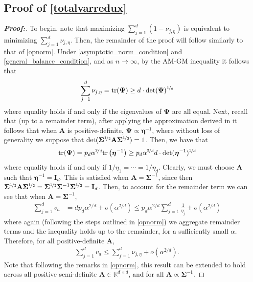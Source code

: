 \documentclass[11pt,twoside]{article}
\theoremstyle{definition}
\theoremstyle{remark}
\begin{document}
\subsection{Proof of \texorpdfstring{\cref{totalvarredux}}{Theorem 3}} \label{totalvarredux_proof}
\begin{proof}[\textbf{Proof:}]
To begin, note that maximizing $\sum^d_{j=1}(1 - \nu_{j, \eta})$ is equivalent to minimizing $\sum^d_{j=1} \nu_{j, \eta}$. Then, the remainder of the proof will follow similarly to that of \cref{opnorm}. Under \cref{asymptotic_norm_condition} and \cref{general_balance_condition}, and as $n \to \infty$, by the AM-GM inequality it follows that
\begin{align*}
    \sum^d_{j=1} \nu_{j, \eta} = \text{tr}(\mathbf{\Psi})  \geq d  \cdot \text{det}(\mathbf{\Psi})^{\nicefrac{1}{d}}
\end{align*}
where equality holds if and only if the eigenvalues of $\mathbf{\Psi}$ are all equal. Next, recall that (up to a remainder term), after applying the approximation derived in \cite{lu2023design} it follows that when $\mathbf{A}$ is positive-definite, $\mathbf{\Psi} \propto \bm{\eta}^{-1}$, where without loss of generality we suppose that $\text{det}(\mathbf{\Sigma}^{\nicefrac{1}{2}}\mathbf{A}\mathbf{\Sigma}^{\nicefrac{1}{2}}) = 1$. Then, we have that
\begin{align*}
     \text{tr}(\mathbf{\Psi}) =  p_d \alpha^{\nicefrac{2}{d}} \text{tr}\left( \bm{\eta}^{-1}   \right) \geq p_d \alpha^{\nicefrac{2}{d}} d \cdot \text{det}(\bm{\eta}^{-1})^{\nicefrac{1}{d}}
\end{align*}
where equality holds if and only if $1/\eta_1 = \cdots = 1 / \eta_d$. Clearly, we must choose $\mathbf{A}$ such that $\bm{\eta}^{-1} = \mathbf{I}_d$. This is satisfied when $\mathbf{A} = \mathbf{\Sigma}^{-1}$, since then $\mathbf{\Sigma}^{\nicefrac{1}{2}}\mathbf{A}\mathbf{\Sigma}^{\nicefrac{1}{2}} = \mathbf{\Sigma}^{\nicefrac{1}{2}} \mathbf{\Sigma}^{-1}\mathbf{\Sigma}^{\nicefrac{1}{2}} = \mathbf{I}_d$. Then, to account for the remainder term we can see that when $\mathbf{A} = \mathbf{\Sigma}^{-1}$,
    \begin{align*}
        \sum^d_{j=1} v_a &= d p_d \alpha^{2/d} + o(\alpha^{2/d}) \leq  p_d \alpha^{2/d} \sum^d_{j=1} \frac{1}{\eta_j} + o(\alpha^{2/d})
    \end{align*}
where again (following the steps outlined in \cref{opnorm}) we aggregate remainder terms and the inequality holds up to the remainder, for a sufficiently small $\alpha$. Therefore, for all positive-definite $\mathbf{A}$,
    \begin{align*}
         \sum^d_{j=1} v_a  \leq \sum^d_{j=1} \nu_{j, \eta} + o(\alpha^{2/d}).
    \end{align*}
Note that following the remarks in \cref{opnorm}, this result can be extended to hold across all positive semi-definite $\mathbf{A} \in \mathbb{R}^{d \times d}$, and for all $\mathbf{A} \propto \mathbf{\Sigma}^{-1}$.
\end{proof}
\end{document}
